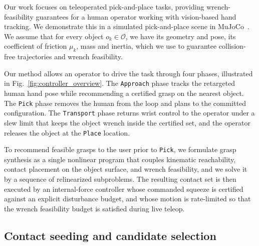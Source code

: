 %
%

\label{sec:method}

Our work focuses on teleoperated pick-and-place tasks, providing wrench-feasibility
guarantees for a human operator working with vision-based hand tracking. We
demonstrate this in a simulated pick-and-place scene in
MuJoCo~\cite{todorovMuJoCoPhysicsEngine2012}. We assume that for every object
$o_k \in \mathcal{O}$, we have its geometry and pose, its coefficient of friction
$\mu_k$, mass and inertia, which we use to guarantee collision-free trajectories and
wrench feasibility.

Our method allows an operator to drive the task through four phases, illustrated in
Fig.~\ref{fig:controller_overview}. The \texttt{Approach} phase tracks the retargeted
human hand pose while recommending a certified grasp on the nearest object. The
\texttt{Pick} phase removes the human from the loop and plans to the committed
configuration. The \texttt{Transport} phase returns wrist control to the operator
under a slew limit that keeps the object wrench inside the certified set, and the
operator releases the object at the \texttt{Place} location.

To recommend feasible grasps to the user prior to \texttt{Pick}, we formulate grasp
synthesis as a single nonlinear program that couples kinematic reachability, contact
placement on the object surface, and wrench feasibility, and we solve it by a sequence
of relinearized subproblems. The resulting contact set is then executed by an
internal-force controller whose commanded squeeze is certified against an explicit
disturbance budget, and whose motion is rate-limited so that the wrench feasibility
budget is satisfied during live teleop.

\subsection{Contact seeding and candidate selection}
\label{sec:seeding}


